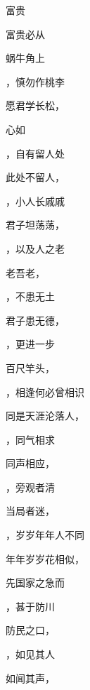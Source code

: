 \documentclass[12pt, a4paper, addpoints, answers]{exam}
\begin{document}
\begin{multicols}{2}
\begin{questions}
\question[2] 富贵

\question[2] 富贵必从

\question[2] 

\question[2] 蜗牛角上

\question[2] ，慎勿作桃李

\question[2] 愿君学长松，

\question[2] 

\question[2] 心如

\question[2] ，自有留人处

\question[2] 此处不留人，

\question[2] ，小人长戚戚

\question[2] 君子坦荡荡，

\question[2] ，以及人之老

\question[2] 老吾老，

\question[2] ，不患无土

\question[2] 君子患无德，

\question[2] ，更进一步

\question[2] 百尺竿头，

\question[2] ，相逢何必曾相识

\question[2] 同是天涯沦落人，

\question[2] ，同气相求

\question[2] 同声相应，

\question[2] ，旁观者清

\question[2] 当局者迷，

\question[2] ，岁岁年年人不同

\question[2] 年年岁岁花相似，

\question[2] 

\question[2] 先国家之急而

\question[2] ，甚于防川

\question[2] 防民之口，

\question[2] ，如见其人

\question[2] 如闻其声，


\end{questions}
\end{multicols}
\end{document}
